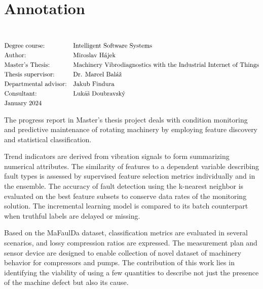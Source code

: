 \thispagestyle{empty}
\section*{Annotation}
\UniversityEN \\
\uppercase{\FacultyEN}
\vspace{-8pt}
{\setlength{\mathindent}{0cm}
\begin{align*}
&\text{Degree course:} && \text{\StudyProgrammeEN} \\
&\text{Author:} && \text{\AuthorEN} \\
&\text{\ThesisEN:} && \text{\TitleEN} \\
&\text{Thesis supervisor:} && \text{\SupervisorEN} \\
&\text{Departmental advisor:} && \text{\DepartmentalAdvisorEN} \\
&\text{Consultant:} && \text{\ConsultantEN} \\
&\text{\DateEN}
\end{align*}}

The progress report in Master's thesis project  deals with condition monitoring and predictive maintenance of rotating machinery by employing feature discovery and statistical classification. 

Trend indicators are derived from vibration signals to form summarizing numerical attributes. The similarity of features to a dependent variable describing fault types is assessed by supervised feature selection metrics individually and in the ensemble. The accuracy of fault detection using the k-nearest neighbor is evaluated on the best feature subsets to conserve data rates of the monitoring solution. The incremental learning model is compared to its batch counterpart when truthful labels are delayed or missing. 


Based on the MaFaulDa dataset, classification metrics are evaluated in several scenarios, and lossy compression ratios are expressed. The measurement plan and sensor device are designed to enable collection of novel dataset of machinery behavior for compressors and pumps. The contribution of this work lies in identifying the viability of using a few quantities to describe not just the presence of the machine defect but also its cause.
\emptypage 

\thispagestyle{empty}
